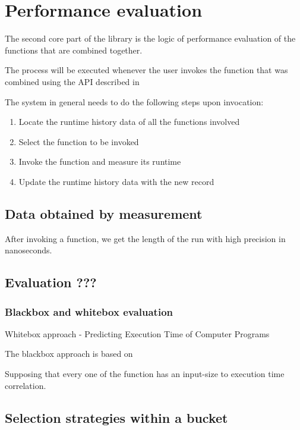 \chapter{Performance evaluation}

The second core part of the library is the logic of performance evaluation of the functions that are combined together.

The process will be executed whenever the user invokes the function that was combined using the API described in %

The system in general needs to do the following steps upon invocation:

\begin{enumerate}
	\item Locate the runtime history data of all the functions involved
	\item Select the function to be invoked
	\item Invoke the function and measure its runtime
	\item Update the runtime history data with the new record
\end{enumerate}

\section{Data obtained by measurement}

After invoking a function, we get the length of the run with high precision in nanoseconds.

\section{Evaluation ???}

\subsection{Blackbox and whitebox evaluation}

Whitebox approach - Predicting Execution Time of Computer Programs


The blackbox approach is based on 

Supposing that every one of the function has an input-size to execution time correlation. 

\section{Selection strategies within a bucket}

